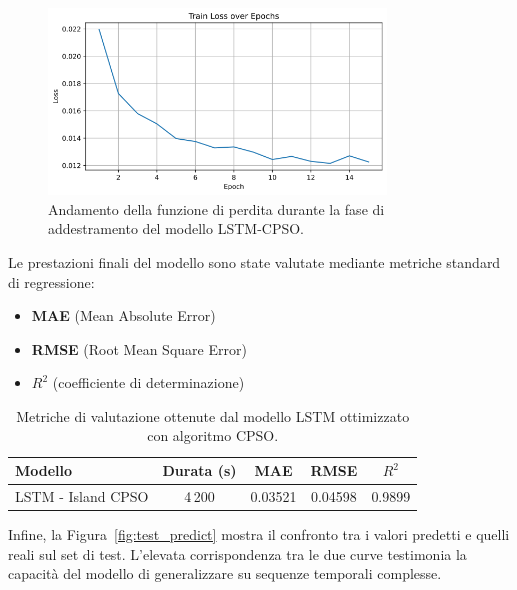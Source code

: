 \documentclass{article}
\begin{document}
\begin{figure}[H]
    \centering
    \includegraphics[width=0.8\textwidth]{img/Train Loss.png}
    \caption{Andamento della funzione di perdita durante la fase di addestramento del modello LSTM-CPSO.}
    \label{fig:train_loss}
\end{figure}

Le prestazioni finali del modello sono state valutate mediante metriche standard di regressione:

\vspace{0.5em}
\begin{itemize}
    \item \textbf{MAE} (Mean Absolute Error)
    \item \textbf{RMSE} (Root Mean Square Error)
    \item \textbf{$R^2$} (coefficiente di determinazione)
\end{itemize}
\vspace{0.5em}

\begin{table}[H]
    \centering
    \renewcommand{\arraystretch}{1.2}
    \begin{tabular}{lcccc}
        \toprule
        \textbf{Modello} & \textbf{Durata (s)} & \textbf{MAE} & \textbf{RMSE} & \boldmath$R^2$ \\
        \midrule
        LSTM - Island CPSO & 4\,200 & 0.03521 & 0.04598 & 0.9899 \\
        \bottomrule
    \end{tabular}
    \caption{Metriche di valutazione ottenute dal modello LSTM ottimizzato con algoritmo CPSO.}
    \label{tab:Result_LSTM_CPSO}
\end{table}

Infine, la Figura~\ref{fig:test_predict} mostra il confronto tra i valori predetti e quelli reali 
sul set di test. L’elevata corrispondenza tra le due curve testimonia la capacità del modello di 
generalizzare su sequenze temporali complesse.
\end{document}

